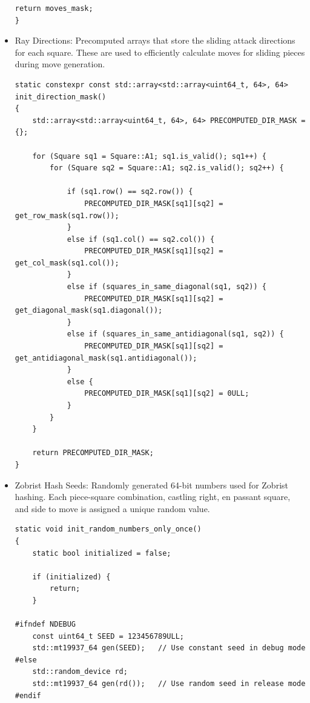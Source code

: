 \begin{itemize}
\begin{lstlisting}[breaklines=true, frame=single, caption={Initialization of bishop attack tables}]
    return moves_mask;
}
\end{lstlisting}

    \item Ray Directions: Precomputed arrays that store the sliding attack directions for each square. These are used to efficiently calculate moves for sliding pieces during move generation.
    
\begin{lstlisting}[breaklines=true, frame=single, caption={Initialization of directions masks}]
static constexpr const std::array<std::array<uint64_t, 64>, 64> init_direction_mask()
{
    std::array<std::array<uint64_t, 64>, 64> PRECOMPUTED_DIR_MASK = {};

    for (Square sq1 = Square::A1; sq1.is_valid(); sq1++) {
        for (Square sq2 = Square::A1; sq2.is_valid(); sq2++) {

            if (sq1.row() == sq2.row()) {
                PRECOMPUTED_DIR_MASK[sq1][sq2] = get_row_mask(sq1.row());
            }
            else if (sq1.col() == sq2.col()) {
                PRECOMPUTED_DIR_MASK[sq1][sq2] = get_col_mask(sq1.col());
            }
            else if (squares_in_same_diagonal(sq1, sq2)) {
                PRECOMPUTED_DIR_MASK[sq1][sq2] = get_diagonal_mask(sq1.diagonal());
            }
            else if (squares_in_same_antidiagonal(sq1, sq2)) {
                PRECOMPUTED_DIR_MASK[sq1][sq2] = get_antidiagonal_mask(sq1.antidiagonal());
            }
            else {
                PRECOMPUTED_DIR_MASK[sq1][sq2] = 0ULL;
            }
        }
    }

    return PRECOMPUTED_DIR_MASK;
}
\end{lstlisting}
    
    \item Zobrist Hash Seeds: Randomly generated 64-bit numbers used for Zobrist hashing. Each piece-square combination, castling right, en passant square, and side to move is assigned a unique random value.
    
\begin{lstlisting}[breaklines=true, frame=single, caption={Initialization of seeds}]
static void init_random_numbers_only_once()
{
    static bool initialized = false;

    if (initialized) {
        return;
    }

#ifndef NDEBUG
    const uint64_t SEED = 123456789ULL;
    std::mt19937_64 gen(SEED);   // Use constant seed in debug mode
#else
    std::random_device rd;
    std::mt19937_64 gen(rd());   // Use random seed in release mode
#endif


\end{lstlisting}
\end{itemize}
